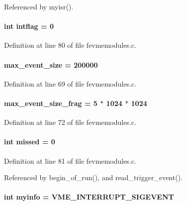 Referenced by myisr().
\paragraph[{intflag}]{\setlength{\rightskip}{0pt plus 5cm}int {\bf intflag} = 0}\hfill\label{fevmemodules_8c_af04b8670f9eb7a42f73148ced267ab35}


Definition at line 80 of file fevmemodules.c.
\paragraph[{max\_\-event\_\-size}]{ {\bf max\_\-event\_\-size} = 200000}\hfill\label{fevmemodules_8c_a13adb6e6b95ca2a62bbfe2453d71a1cd}


Definition at line 69 of file fevmemodules.c.
\paragraph[{max\_\-event\_\-size\_\-frag}]{ {\bf max\_\-event\_\-size\_\-frag} = 5 $\ast$ 1024 $\ast$ 1024}\hfill\label{fevmemodules_8c_a5593758d19398ebc7c3d58d7f05ec160}


Definition at line 72 of file fevmemodules.c.
\paragraph[{missed}]{\setlength{\rightskip}{0pt plus 5cm}int {\bf missed} = 0}\hfill\label{fevmemodules_8c_a6cde1377f6c51796f78ef647404f396a}


Definition at line 81 of file fevmemodules.c.

Referenced by begin\_\-of\_\-run(), and read\_\-trigger\_\-event().
\paragraph[{myinfo}]{\setlength{\rightskip}{0pt plus 5cm}int {\bf myinfo} = VME\_\-INTERRUPT\_\-SIGEVENT}\hfill\label{fevmemodules_8c_a078c7a09da85e54e060ec80b7f9e2649}


